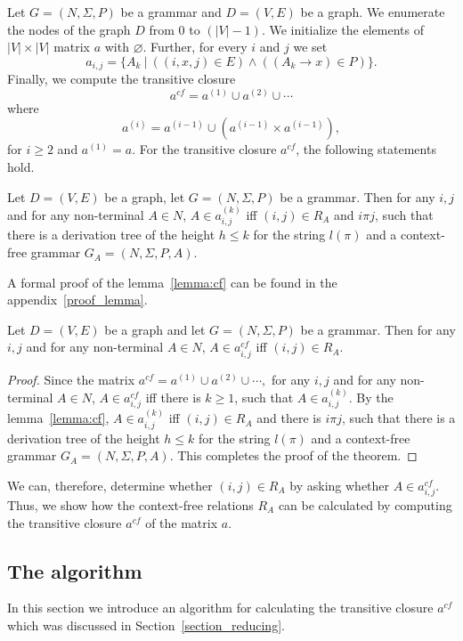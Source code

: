 \documentclass[runningheads,a4paper]{llncs}
\begin{document}
Let $G = (N,\Sigma,P)$ be a grammar and $D = (V, E)$ be a graph. We enumerate the nodes of the graph $D$ from 0 to $(|V| - 1)$. We initialize the elements of $|V| \times |V|$ matrix $a$ with $\varnothing$. Further, for every $i$ and $j$ we set $$a_{i,j} = \{A_k~|~((i,x,j) \in E) \wedge ((A_k \rightarrow x) \in P)\}.$$ Finally, we compute the transitive closure $$a^{cf} = a^{(1)} \cup a^{(2)} \cup \cdots$$ where $$a^{(i)} = a^{(i-1)} \cup (a^{(i-1)} \times a^{(i-1)}),$$ for $i \ge 2$ and $a^{(1)} = a$. For the transitive closure $a^{cf}$, the following statements hold.

\begin{lemma}\label{lemma:cf}
	Let $D = (V,E)$ be a graph, let $G =(N,\Sigma,P)$ be a grammar. Then for any $i, j$ and for any non-terminal $A \in N$, $A \in a^{(k)}_{i,j}$ iff $(i,j) \in R_A$ and $i \pi j$, such that there is a derivation tree of the height $h \leq k$ for the string $l(\pi)$ and a context-free grammar $G_A = (N,\Sigma,P,A)$.
\end{lemma}

A formal proof of the lemma~\ref{lemma:cf} can be found in the appendix~\ref{proof_lemma}.

\begin{mytheorem}\label{thm:correct}
	Let $D = (V,E)$ be a graph and let $G =(N,\Sigma,P)$ be a grammar. Then for any $i, j$ and for any non-terminal $A \in N$, $A \in a^{cf}_{i,j}$ iff $(i,j) \in R_A$.
\end{mytheorem}
\begin{proof}
	
	Since the matrix $a^{cf} = a^{(1)} \cup a^{(2)} \cup \cdots,$ for any $i, j$ and for any non-terminal $A \in N$, $A \in a^{cf}_{i,j}$ iff there is $k \geq 1$, such that $A \in a^{(k)}_{i,j}$. By the lemma~\ref{lemma:cf}, $A \in a^{(k)}_{i,j}$ iff $(i,j) \in R_A$ and there is $i \pi j$, such that there is a derivation tree of the height $h \leq k$ for the string $l(\pi)$ and a context-free grammar $G_A = (N,\Sigma,P,A)$. This completes the proof of the theorem.
\end{proof}

We can, therefore, determine whether $(i,j) \in R_A$ by asking whether $A \in a^{cf}_{i,j}$. Thus, we show how the context-free relations $R_A$ can be calculated by computing the transitive closure $a^{cf}$ of the matrix $a$.



\subsection{The algorithm} \label{section_algorithm}
In this section we introduce an algorithm for calculating the transitive closure $a^{cf}$ which was discussed in Section~\ref{section_reducing}.
\end{document}

